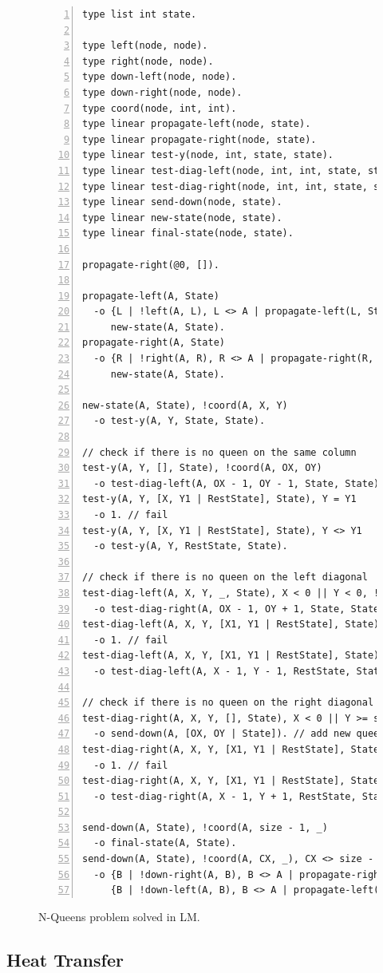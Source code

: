 \begin{figure}[h!]
\begin{Verbatim}[numbers=left,fontsize=\scriptsize]
type list int state.

type left(node, node).
type right(node, node).
type down-left(node, node).
type down-right(node, node).
type coord(node, int, int).
type linear propagate-left(node, state).
type linear propagate-right(node, state).
type linear test-y(node, int, state, state).
type linear test-diag-left(node, int, int, state, state).
type linear test-diag-right(node, int, int, state, state).
type linear send-down(node, state).
type linear new-state(node, state).
type linear final-state(node, state).

propagate-right(@0, []).

propagate-left(A, State)
  -o {L | !left(A, L), L <> A | propagate-left(L, State)},
     new-state(A, State).
propagate-right(A, State)
  -o {R | !right(A, R), R <> A | propagate-right(R, State)},
     new-state(A, State).

new-state(A, State), !coord(A, X, Y)
  -o test-y(A, Y, State, State).

// check if there is no queen on the same column
test-y(A, Y, [], State), !coord(A, OX, OY)
  -o test-diag-left(A, OX - 1, OY - 1, State, State).
test-y(A, Y, [X, Y1 | RestState], State), Y = Y1
  -o 1. // fail
test-y(A, Y, [X, Y1 | RestState], State), Y <> Y1
  -o test-y(A, Y, RestState, State).

// check if there is no queen on the left diagonal
test-diag-left(A, X, Y, _, State), X < 0 || Y < 0, !coord(A, OX, OY)
  -o test-diag-right(A, OX - 1, OY + 1, State, State).
test-diag-left(A, X, Y, [X1, Y1 | RestState], State), X = X1, Y = Y1
  -o 1. // fail
test-diag-left(A, X, Y, [X1, Y1 | RestState], State), X <> X1 || Y <> Y1
  -o test-diag-left(A, X - 1, Y - 1, RestState, State).

// check if there is no queen on the right diagonal
test-diag-right(A, X, Y, [], State), X < 0 || Y >= size, !coord(A, OX, OY)
  -o send-down(A, [OX, OY | State]). // add new queen
test-diag-right(A, X, Y, [X1, Y1 | RestState], State), X = X1, Y = Y1
  -o 1. // fail
test-diag-right(A, X, Y, [X1, Y1 | RestState], State), X <> X1 || Y <> Y1
  -o test-diag-right(A, X - 1, Y + 1, RestState, State).

send-down(A, State), !coord(A, size - 1, _)
  -o final-state(A, State).
send-down(A, State), !coord(A, CX, _), CX <> size - 1
  -o {B | !down-right(A, B), B <> A | propagate-right(B, State)},
     {B | !down-left(A, B), B <> A | propagate-left(B, State)}.
\end{Verbatim}
  \caption{N-Queens problem solved in LM.}
  \label{coordination:code:nqueens}
\end{figure}


\subsection{Heat Transfer}


